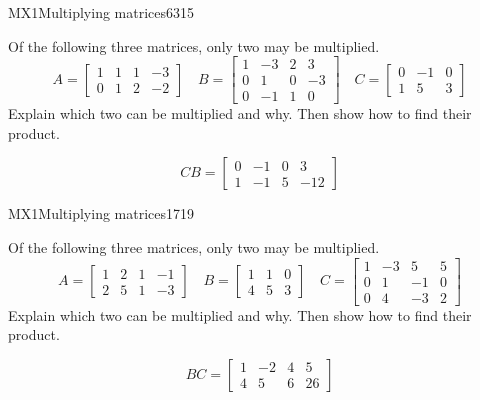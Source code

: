 \begin{exercise}{MX1}{Multiplying matrices}{6315} 
\begin{exerciseStatement} 

Of the following three matrices, only two may be multiplied. \[
          A=\left[\begin{array}{cccc}
1 & 1 & 1 & -3 \\
0 & 1 & 2 & -2
\end{array}\right] \hspace{1em} B=\left[\begin{array}{cccc}
1 & -3 & 2 & 3 \\
0 & 1 & 0 & -3 \\
0 & -1 & 1 & 0
\end{array}\right] \hspace{1em} C=\left[\begin{array}{ccc}
0 & -1 & 0 \\
1 & 5 & 3
\end{array}\right]
      \] Explain which two can be multiplied and why. Then show how to find their product.

 \end{exerciseStatement}
 \begin{exerciseAnswer} \[CB=\left[\begin{array}{cccc}
0 & -1 & 0 & 3 \\
1 & -1 & 5 & -12
\end{array}\right]\] \end{exerciseAnswer}
 \end{exercise}


\begin{exercise}{MX1}{Multiplying matrices}{1719} 
\begin{exerciseStatement} 

Of the following three matrices, only two may be multiplied. \[
          A=\left[\begin{array}{cccc}
1 & 2 & 1 & -1 \\
2 & 5 & 1 & -3
\end{array}\right] \hspace{1em} B=\left[\begin{array}{ccc}
1 & 1 & 0 \\
4 & 5 & 3
\end{array}\right] \hspace{1em} C=\left[\begin{array}{cccc}
1 & -3 & 5 & 5 \\
0 & 1 & -1 & 0 \\
0 & 4 & -3 & 2
\end{array}\right]
      \] Explain which two can be multiplied and why. Then show how to find their product.

 \end{exerciseStatement}
 \begin{exerciseAnswer} \[BC=\left[\begin{array}{cccc}
1 & -2 & 4 & 5 \\
4 & 5 & 6 & 26
\end{array}\right]\] \end{exerciseAnswer}
 \end{exercise}


